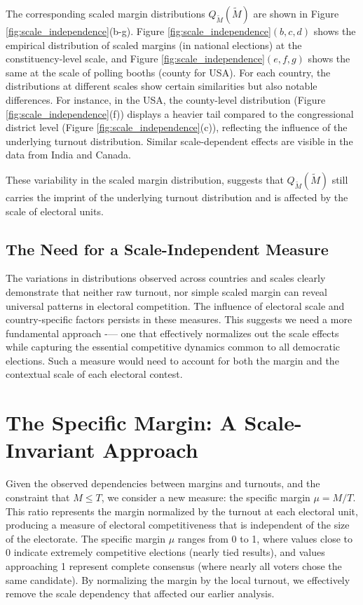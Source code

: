 The corresponding scaled margin distributions $Q_{\widetilde{M}}\left(\widetilde{M}\right)$ are shown in Figure \ref{fig:scale_independence}(b-g). Figure \ref{fig:scale_independence}$(b, c, d)$ shows the empirical distribution of scaled margins (in national elections) at the constituency-level scale, and Figure \ref{fig:scale_independence}$(e, f, g)$ shows the same at the scale of polling booths (county for USA). For each country, the distributions at different scales show certain similarities but also notable differences. For instance, in the USA, the county-level distribution (Figure \ref{fig:scale_independence}(f)) displays a heavier tail compared to the congressional district level (Figure \ref{fig:scale_independence}(c)), reflecting the influence of the underlying turnout distribution. Similar scale-dependent effects are visible in the data from India and Canada.

These variability in the scaled margin distribution, suggests that $Q_{\widetilde{M}}\left(\widetilde{M}\right)$ still carries the imprint of the underlying turnout distribution and is affected by the scale of electoral units. 

\subsection{The Need for a Scale-Independent Measure}

The variations in distributions observed across countries and scales clearly demonstrate that neither raw turnout, nor simple scaled margin can reveal universal patterns in electoral competition. The influence of electoral scale and country-specific factors persists in these measures. This suggests we need a more fundamental approach -— one that effectively normalizes out the scale effects while capturing the essential competitive dynamics common to all democratic elections. Such a measure would need to account for both the margin and the contextual scale of each electoral contest.

\section{The Specific Margin: A Scale-Invariant Approach}

Given the observed dependencies between margins and turnouts, and the constraint that $M \leq T$, we consider a new measure: the specific margin $\mu = M/T$. This ratio represents the margin normalized by the turnout at each electoral unit, producing a measure of electoral competitiveness that is independent of the size of the electorate. The specific margin $\mu$ ranges from 0 to 1, where values close to 0 indicate extremely competitive elections (nearly tied results), and values approaching 1 represent complete consensus (where nearly all voters chose the same candidate). By normalizing the margin by the local turnout, we effectively remove the scale dependency that affected our earlier analysis.


